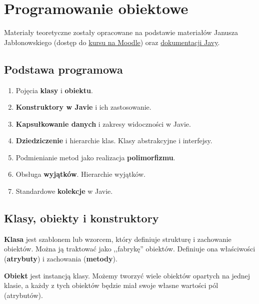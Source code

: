 \chapter{Programowanie obiektowe}

Materiały teoretyczne zostały opracowane na podstawie materiałów Janusza Jabłonowskiego (dostęp do \href{https://moodle.mimuw.edu.pl/course/view.php?id=916}{kursu na Moodle}) oraz \href{https://docs.oracle.com/javase/specs/}{dokumentacji Javy}.

\section*{Podstawa programowa}
\begin{enumerate}
    \item Pojęcia \textbf{klasy} i \textbf{obiektu}.
    \item \textbf{Konstruktory w Javie} i ich zastosowanie.
    \item \textbf{Kapsułkowanie danych} i zakresy widoczności w Javie.
    \item \textbf{Dziedziczenie} i hierarchie klas. Klasy abstrakcyjne i interfejsy.
    \item Podmienianie metod jako realizacja \textbf{polimorfizmu}.
    \item Obsługa \textbf{wyjątków}. Hierarchie wyjątków.
    \item Standardowe \textbf{kolekcje} w Javie.
\end{enumerate}

\section{Klasy, obiekty i konstruktory}

\textbf{Klasa} jest szablonem lub wzorcem, który definiuje strukturę i zachowanie obiektów. Można ją traktować jako ,,fabrykę'' obiektów. Definiuje ona właściwości (\textbf{atrybuty}) i zachowania (\textbf{metody}).

\textbf{Obiekt} jest instancją klasy. Możemy tworzyć wiele obiektów opartych na jednej klasie, a każdy z tych obiektów będzie miał swoje własne wartości pól (atrybutów).

